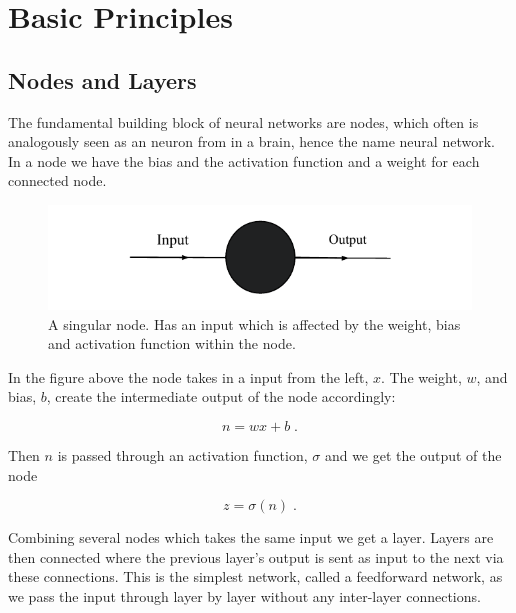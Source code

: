 \section{Basic Principles}
\subsection{Nodes and Layers}
The fundamental building block of neural networks are nodes, which often is analogously seen as an neuron from in a brain, hence the name neural network. In a node we have the bias and the activation function and a weight for each connected node.

\begin{figure}[H]
    \centering
    \includegraphics{Figures/Drawn/machinelearning/onenode.pdf}
    \caption{A singular node. Has an input which is affected by the weight, bias and activation function within the node.}
    \label{fig:onenode}
\end{figure}

In the figure above the node takes in a input from the left, $x$. The weight, $w$, and bias, $b$, create the intermediate output of the node accordingly:

\begin{equation}
    n = wx + b \; .
\end{equation}

Then $n$ is passed through an activation function, $\sigma$ and we get the output of the node

\begin{equation}
    z = \sigma \left ( n \right ) \; .
\end{equation}

Combining several nodes which takes the same input we get a layer. Layers are then connected where the previous layer's output is sent as input to the next via these connections. This is the simplest network, called a feedforward network, as we pass the input through layer by layer without any inter-layer connections.

